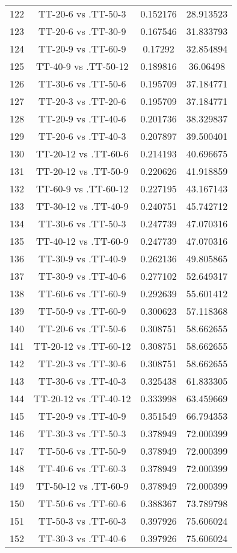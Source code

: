 \documentclass[a4paper,10pt]{article}
\begin{document}
\begin{landscape}
\begin{table}[!htp]
\begin{tabular}{cccc}
122&TT-20-6 vs .TT-50-3&0.152176&28.913523\\
123&TT-20-6 vs .TT-30-9&0.167546&31.833793\\
124&TT-20-9 vs .TT-60-9&0.17292&32.854894\\
125&TT-40-9 vs .TT-50-12&0.189816&36.06498\\
126&TT-30-6 vs .TT-50-6&0.195709&37.184771\\
127&TT-20-3 vs .TT-20-6&0.195709&37.184771\\
128&TT-20-9 vs .TT-40-6&0.201736&38.329837\\
129&TT-20-6 vs .TT-40-3&0.207897&39.500401\\
130&TT-20-12 vs .TT-60-6&0.214193&40.696675\\
131&TT-20-12 vs .TT-50-9&0.220626&41.918859\\
132&TT-60-9 vs .TT-60-12&0.227195&43.167143\\
133&TT-30-12 vs .TT-40-9&0.240751&45.742712\\
134&TT-30-6 vs .TT-50-3&0.247739&47.070316\\
135&TT-40-12 vs .TT-60-9&0.247739&47.070316\\
136&TT-30-9 vs .TT-40-9&0.262136&49.805865\\
137&TT-30-9 vs .TT-40-6&0.277102&52.649317\\
138&TT-60-6 vs .TT-60-9&0.292639&55.601412\\
139&TT-50-9 vs .TT-60-9&0.300623&57.118368\\
140&TT-20-6 vs .TT-50-6&0.308751&58.662655\\
141&TT-20-12 vs .TT-60-12&0.308751&58.662655\\
142&TT-20-3 vs .TT-30-6&0.308751&58.662655\\
143&TT-30-6 vs .TT-40-3&0.325438&61.833305\\
144&TT-20-12 vs .TT-40-12&0.333998&63.459669\\
145&TT-20-9 vs .TT-40-9&0.351549&66.794353\\
146&TT-30-3 vs .TT-50-3&0.378949&72.000399\\
147&TT-50-6 vs .TT-50-9&0.378949&72.000399\\
148&TT-40-6 vs .TT-60-3&0.378949&72.000399\\
149&TT-50-12 vs .TT-60-9&0.378949&72.000399\\
150&TT-50-6 vs .TT-60-6&0.388367&73.789798\\
151&TT-50-3 vs .TT-60-3&0.397926&75.606024\\
152&TT-30-3 vs .TT-40-6&0.397926&75.606024\\

\end{tabular}
\end{table}
\end{landscape}
\end{document}
